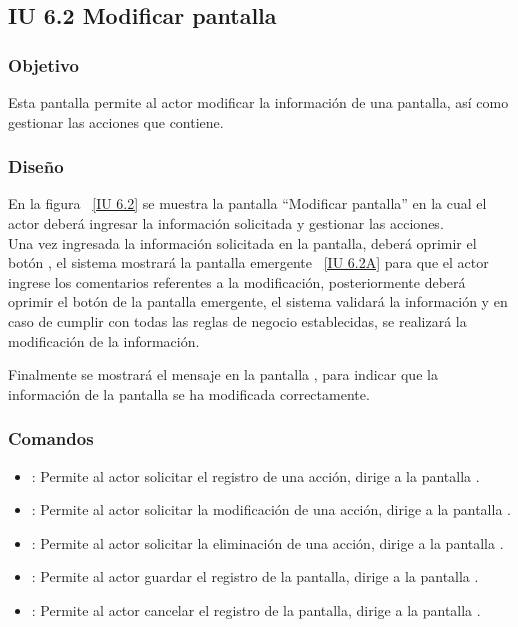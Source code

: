 \subsection{IU 6.2 Modificar pantalla}

\subsubsection{Objetivo}
	
	Esta pantalla permite al actor modificar la información de una pantalla, así como gestionar las acciones que contiene.

\subsubsection{Diseño}

    En la figura ~\ref{IU 6.2} se muestra la pantalla ``Modificar pantalla'' en la cual el actor deberá ingresar la información solicitada y gestionar las acciones. \\
    
    Una vez ingresada la información solicitada en la pantalla, deberá oprimir el botón , el sistema mostrará la pantalla emergente ~\ref{IU 6.2A} para que el actor ingrese los comentarios referentes a la modificación, posteriormente deberá oprimir el botón  de la pantalla emergente, el sistema validará la información y en caso de cumplir con todas las reglas de negocio establecidas, se realizará la modificación de la información.
    
    Finalmente se mostrará el mensaje  en la pantalla , para indicar que la información de la pantalla se ha modificada correctamente.        



\subsubsection{Comandos}
\begin{itemize}
	\item {}: Permite al actor solicitar el registro de una acción, dirige a la pantalla .
	\item \btnEditar[Modificar]: Permite al actor solicitar la modificación de una acción, dirige a la pantalla .
	\item \btnEliminar[Eliminar]: Permite al actor solicitar la eliminación de una acción, dirige a la pantalla .
	\item {}: Permite al actor guardar el registro de la pantalla, dirige a la pantalla .
	\item {}: Permite al actor cancelar el registro de la pantalla, dirige a la pantalla .
\end{itemize}

